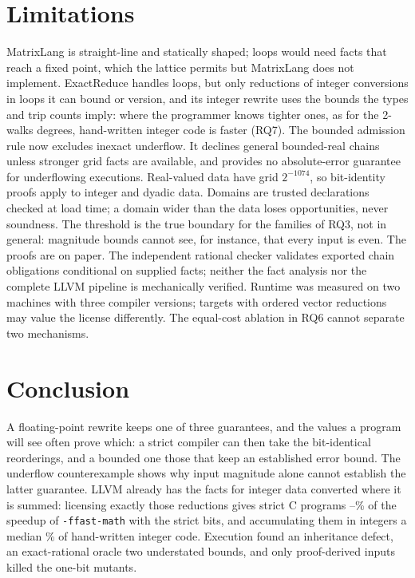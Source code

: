 \documentclass[acmsmall,review,anonymous,nonacm]{acmart}
\begin{document}
\section{Limitations}\label{sec:limits}
MatrixLang is straight-line and statically shaped; loops would need facts that
reach a fixed point, which the lattice permits but MatrixLang does not
implement. ExactReduce handles loops, but only reductions of integer
conversions in loops it can bound or version, and its integer rewrite uses the
bounds the types and trip counts imply: where the programmer knows tighter
ones, as for the 2-walks degrees, hand-written integer code is faster (RQ7). The
bounded admission rule now excludes inexact underflow. It declines
general bounded-real chains unless stronger grid facts are available, and
provides no absolute-error guarantee for underflowing executions.
Real-valued data have grid $2^{-1074}$, so bit-identity proofs apply to integer
and dyadic data. Domains are trusted declarations checked at load time; a
domain wider than the data loses opportunities, never soundness. The threshold
is the true boundary for the families of RQ3, not in general: magnitude bounds
cannot see, for instance, that every input is even. The proofs are on paper. The independent rational checker validates
exported chain obligations conditional on supplied facts; neither the fact
analysis nor the complete LLVM pipeline is mechanically verified.
Runtime was measured on two machines with three compiler versions; targets with
ordered vector reductions may value the license differently. The equal-cost
ablation in RQ6 cannot separate two mechanisms.

\section{Conclusion}
A floating-point rewrite keeps one of three guarantees, and the values a program
will see often prove which: a strict compiler can then take the bit-identical
reorderings, and a bounded one those that keep an established error bound.
The underflow counterexample shows why input magnitude alone cannot establish
the latter guarantee. LLVM already has the facts for integer data converted where it
is summed: licensing exactly those reductions gives strict C programs
\LlvmBenchOfFastMathLo--\LlvmBenchOfFastMathHi\% of the speedup of
\texttt{-ffast-math} with the strict bits, and accumulating them in integers a
median \BaseRewriteOfIntMedian\% of hand-written integer code. Execution found
an inheritance defect, an exact-rational oracle two understated bounds, and only
proof-derived inputs killed the one-bit mutants.
\end{document}
